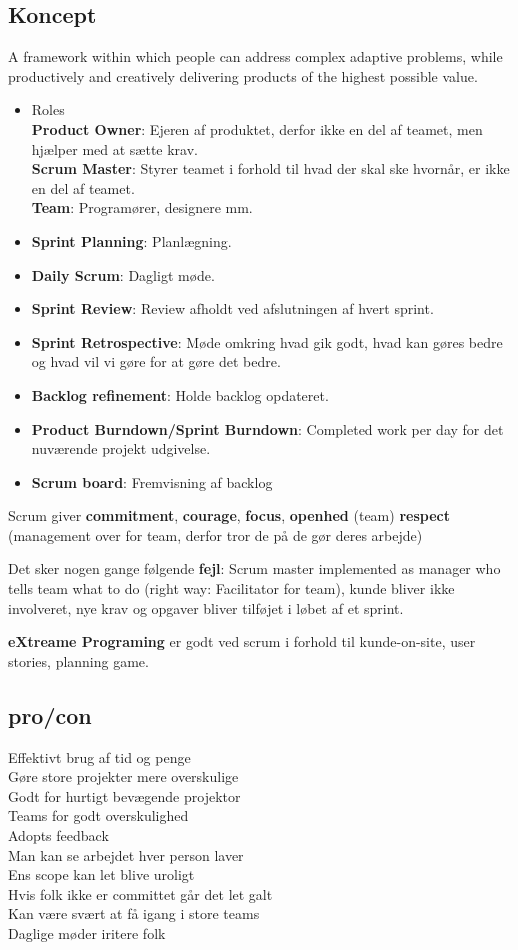 \documentclass[11pt,a4paper]{article}
\begin{document}
\subsection*{Koncept}
A framework within which people can address complex adaptive problems, while productively and creatively delivering products of the highest possible value.
\begin{itemize}
\item Roles\\ \textbf{Product Owner}: Ejeren af produktet, derfor ikke en del af teamet, men hjælper med at sætte krav.\\ \textbf{Scrum Master}: Styrer teamet i forhold til hvad der skal ske hvornår, er ikke en del af teamet.\\ \textbf{Team}: Programører, designere mm.
\item \textbf{Sprint Planning}: Planlægning.
\item \textbf{Daily Scrum}: Dagligt møde.
\item \textbf{Sprint Review}: Review afholdt ved afslutningen af hvert sprint.
\item \textbf{Sprint Retrospective}: Møde omkring hvad gik godt, hvad kan gøres bedre og hvad vil vi gøre for at gøre det bedre.
\item \textbf{Backlog refinement}: Holde backlog opdateret.
\item \textbf{Product Burndown/Sprint Burndown}: Completed work per day for det nuværende projekt udgivelse.
\item \textbf{Scrum board}: Fremvisning af backlog
\end{itemize}
Scrum giver \textbf{commitment}, \textbf{courage}, \textbf{focus}, \textbf{openhed} (team) \textbf{respect} (management over for team, derfor tror de på de gør deres arbejde)

Det sker nogen gange følgende \textbf{fejl}: Scrum master implemented as manager who tells team what to do (right way: Facilitator for team), kunde bliver ikke involveret, nye krav og opgaver bliver tilføjet i løbet af et sprint.

\textbf{eXtreame Programing} er godt ved scrum i forhold til kunde-on-site, user stories, planning game.
\subsection*{pro/con}
Effektivt brug af tid og penge\\
Gøre store projekter mere overskulige\\
Godt for hurtigt bevægende projektor\\
Teams for godt overskulighed\\
Adopts feedback\\
Man kan se arbejdet hver person laver\\
Ens scope kan let blive uroligt\\
Hvis folk ikke er committet går det let galt\\
Kan være svært at få igang i store teams\\
Daglige møder iritere folk\\
\end{document}
